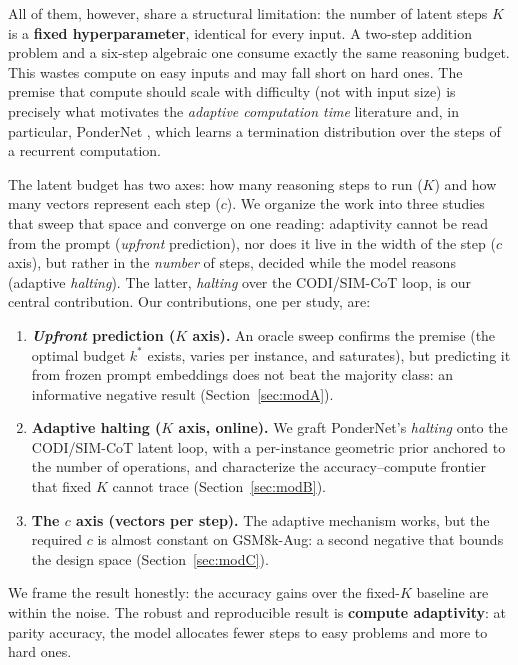 \documentclass[11pt]{article}
\begin{document}
All of them, however, share a structural limitation: the number of latent steps $K$ is a \textbf{fixed hyperparameter}, identical for every input. A two-step addition problem and a six-step algebraic one consume exactly the same reasoning budget. This wastes compute on easy inputs and may fall short on hard ones. The premise that compute should scale with difficulty (not with input size) is precisely what motivates the \emph{adaptive computation time} literature \citep{graves2016act} and, in particular, PonderNet \citep{banino2021pondernet}, which learns a termination distribution over the steps of a recurrent computation.

The latent budget has two axes: how many reasoning steps to run ($K$) and how many vectors represent each step ($c$). We organize the work into three studies that sweep that space and converge on one reading: adaptivity cannot be read from the prompt (\emph{upfront} prediction), nor does it live in the width of the step ($c$ axis), but rather in the \emph{number} of steps, decided while the model reasons (adaptive \emph{halting}). The latter, \emph{halting} over the CODI/SIM-CoT loop, is our central contribution. Our contributions, one per study, are:

\begin{enumerate}
  \item \textbf{\textit{Upfront} prediction ($K$ axis).} An oracle sweep confirms the premise (the optimal budget $k^*$ exists, varies per instance, and saturates), but predicting it from frozen prompt embeddings does not beat the majority class: an informative negative result (Section~\ref{sec:modA}).
  \item \textbf{Adaptive halting ($K$ axis, online).} We graft PonderNet's \textit{halting} onto the CODI/SIM-CoT latent loop, with a per-instance geometric prior anchored to the number of operations, and characterize the accuracy--compute frontier that fixed $K$ cannot trace (Section~\ref{sec:modB}).
  \item \textbf{The $c$ axis (vectors per step).} The adaptive mechanism works, but the required $c$ is almost constant on GSM8k-Aug: a second negative that bounds the design space (Section~\ref{sec:modC}).
\end{enumerate}

We frame the result honestly: the accuracy gains over the fixed-$K$ baseline are within the noise. The robust and reproducible result is \textbf{compute adaptivity}: at parity accuracy, the model allocates fewer steps to easy problems and more to hard ones.
\end{document}
